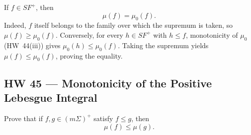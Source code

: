 If $f\in SF^+$, then
\[
\mu(f)=\mu_0(f).
\]
Indeed, $f$ itself belongs to the family over which the supremum is taken, so $\mu(f)\ge\mu_0(f)$. Conversely, for every $h\in SF^+$ with $h\le f$, monotonicity of $\mu_0$ (HW~44(iii)) gives $\mu_0(h)\le\mu_0(f)$. Taking the supremum yields $\mu(f)\le\mu_0(f)$, proving the equality.

\subsection*{HW 45 --- Monotonicity of the Positive Lebesgue Integral}%
%

 Prove that if $f,g\in(m\Sigma)^+$ satisfy $f\le g$, then
\[
\mu(f)\le\mu(g).
\]
